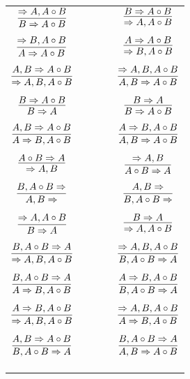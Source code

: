 \documentclass[11pt]{article}
\begin{document}
\begin{center}
\begin{tabular}{ccc}
$\infer{B\Rightarrow A\circ B}{\Rightarrow A, A\circ B}$ & \ \ \ \ & $\infer{\Rightarrow A, A\circ B}{B\Rightarrow A\circ B}$ \\
&& \\
$\infer{A\Rightarrow A\circ B}{\Rightarrow B, A\circ B}$ && $\infer{\Rightarrow B, A\circ B}{A\Rightarrow A\circ B}$ \\
&& \\
$\infer{\Rightarrow A, B, A\circ B}{A, B\Rightarrow A\circ B}$ && $\infer{A, B\Rightarrow A\circ B}{\Rightarrow A, B, A\circ B}$ \\
&& \\
$\infer{B\Rightarrow A}{B\Rightarrow A\circ B}$ && $\infer{B\Rightarrow A\circ B}{B\Rightarrow A}$ \\
&& \\
$\infer{A\Rightarrow B, A\circ B}{A, B\Rightarrow A\circ B}$ && $\infer{A, B\Rightarrow A\circ B}{A\Rightarrow B, A\circ B}$ \\
&& \\
$\infer{\Rightarrow A, B}{A\circ B\Rightarrow A}$ && $\infer{A\circ B\Rightarrow A}{\Rightarrow A, B}$ \\
&& \\
$\infer{A, B\Rightarrow }{B, A\circ B\Rightarrow }$ && $\infer{B, A\circ B\Rightarrow }{A, B\Rightarrow }$ \\
&& \\
$\infer{B\Rightarrow A}{\Rightarrow A, A\circ B}$ && $\infer{\Rightarrow A, A\circ B}{B\Rightarrow A}$ \\
&& \\
$\infer{\Rightarrow A, B, A\circ B}{B, A\circ B\Rightarrow A}$ && $\infer{B, A\circ B\Rightarrow A}{\Rightarrow A, B, A\circ B}$ \\
&& \\
$\infer{A\Rightarrow B, A\circ B}{B, A\circ B\Rightarrow A}$ && $\infer{B, A\circ B\Rightarrow A}{A\Rightarrow B, A\circ B}$ \\
&& \\
$\infer{\Rightarrow A, B, A\circ B}{A\Rightarrow B, A\circ B}$ && $\infer{A\Rightarrow B, A\circ B}{\Rightarrow A, B, A\circ B}$ \\
&& \\
$\infer{B, A\circ B\Rightarrow A}{A, B\Rightarrow A\circ B}$ && $\infer{A, B\Rightarrow A\circ B}{B, A\circ B\Rightarrow A}$ \\
&& \\
&& \\
&& \\

\end{tabular}
\end{center}
\end{document}
